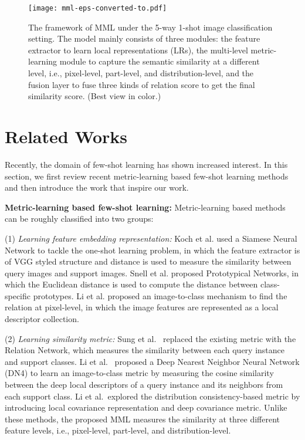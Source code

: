 \documentclass[10pt,twocolumn,letterpaper]{article}
\begin{document}
\begin{figure*}[t]
	\centering
	\texttt{[image: mml-eps-converted-to.pdf]}
	\caption{The framework of MML under the 5-way 1-shot image classification setting. The model mainly consists of three modules: the feature extractor  to learn local representations (LRs), the multi-level metric-learning module to capture the semantic similarity at a different level, i.e., pixel-level, part-level, and distribution-level, and the fusion layer  to fuse three kinds of relation score to get the final similarity score. (Best view in color.)}
	\label{mml_architecture}
\end{figure*}
\section{Related Works}
Recently, the domain of few-shot learning has shown increased interest. In this section, we first review recent metric-learning based few-shot learning methods and then introduce the work that inspire our work.

\textbf{Metric-learning based few-shot learning: } Metric-learning based methods can be roughly classified into two groups: 

(1) \emph{Learning feature embedding representation:}
Koch et al. \cite{koch2015siamese} used a Siamese Neural Network to tackle the one-shot learning problem, in which the feature extractor is of VGG styled structure and  distance is used to measure the similarity between query images and support images.
Snell et al. \cite{snell2017prototypical} proposed Prototypical Networks, in which the Euclidean distance is used to compute the distance between class-specific prototypes. 
Li et al. \cite{li2019revisiting} proposed an image-to-class mechanism to find the relation at pixel-level, in which the image features are represented as a local descriptor collection.


(2) \emph{Learning similarity metric: }
Sung et al.~\cite{sung2018learning} replaced the existing metric with the Relation Network, which measures the similarity between each query instance and support classes. Li et al.~\cite{li2019revisiting} proposed a Deep Nearest Neighbor Neural Network (DN4) to learn an image-to-class metric by measuring the cosine similarity between the deep local descriptors of a query instance and its neighbors from each support class. Li et al.~\cite{li2019distribution}explored the distribution consistency-based metric by introducing local covariance representation and deep covariance metric. Unlike these methods, the proposed MML measures the similarity at three different feature levels, i.e., pixel-level, part-level, and distribution-level.
\end{document}
